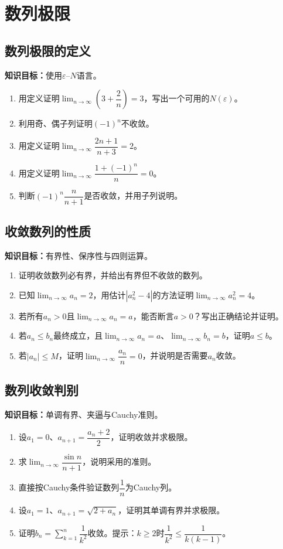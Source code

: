 \documentclass[11pt,a4paper,fontset=fandol]{ctexrep}
\newcommand{\goal}[1]{\textbf{知识目标：}#1\par}
\begin{document}
\section{数列极限}
\subsection{数列极限的定义}
\goal{使用$\varepsilon$--$N$语言。}
\begin{enumerate}
\item 用定义证明$\lim_{n\to\infty}\left(3+\dfrac{2}{n}\right)=3$，写出一个可用的$N(\varepsilon)$。
\item 利用奇、偶子列证明$(-1)^n$不收敛。
\item 用定义证明$\lim_{n\to\infty}\dfrac{2n+1}{n+3}=2$。
\item 用定义证明$\lim_{n\to\infty}\dfrac{1+(-1)^n}{n}=0$。
\item 判断$(-1)^n\dfrac{n}{n+1}$是否收敛，并用子列说明。
\end{enumerate}
\subsection{收敛数列的性质}
\goal{有界性、保序性与四则运算。}
\begin{enumerate}
\item 证明收敛数列必有界，并给出有界但不收敛的数列。
\item 已知$\lim_{n\to\infty}a_n=2$，用估计$|a_n^2-4|$的方法证明$\lim_{n\to\infty}a_n^2=4$。
\item 若所有$a_n>0$且$\lim_{n\to\infty}a_n=a$，能否断言$a>0$？写出正确结论并证明。
\item 若$a_n\le b_n$最终成立，且$\lim_{n\to\infty}a_n=a$、$\lim_{n\to\infty}b_n=b$，证明$a\le b$。
\item 若$|a_n|\le M$，证明$\lim_{n\to\infty}\dfrac{a_n}{n}=0$，并说明是否需要$a_n$收敛。
\end{enumerate}
\subsection{数列收敛判别}
\goal{单调有界、夹逼与Cauchy准则。}
\begin{enumerate}
\item 设$a_1=0$、$a_{n+1}=\dfrac{a_n+2}{2}$，证明收敛并求极限。
\item 求$\lim_{n\to\infty}\dfrac{\sin n}{n+1}$，说明采用的准则。
\item 直接按Cauchy条件验证数列$\dfrac{1}{n}$为Cauchy列。
\item 设$a_1=1$、$a_{n+1}=\sqrt{2+a_n}$，证明其单调有界并求极限。
\item 证明$b_n=\sum_{k=1}^n\dfrac{1}{k^2}$收敛。提示：$k\ge2$时$\dfrac{1}{k^2}\le\dfrac{1}{k(k-1)}$。
\end{enumerate}
\end{document}
